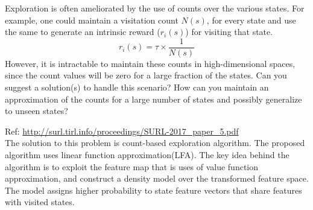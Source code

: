 \documentclass[solution,addpoints,12pt]{exam}
\begin{document}
\begin{questions}
\question[4] Exploration is often ameliorated by the use of counts over the various states. For example, one could maintain a visitation count $N(s)$, for every state and use the same to generate an intrinsic reward ($r_i(s)$) for visiting that state.
\[ r_i(s) = \tau \times \frac{1}{N(s)} \]
However, it is intractable to maintain these counts in high-dimensional spaces, since the count values will be zero for a large fraction of the states. Can you suggest a solution(s) to handle this scenario? How can you maintain an approximation of the counts for a large number of states and possibly generalize to unseen states?

\begin{solution}
Ref: \url{http://surl.tirl.info/proceedings/SURL-2017_paper_5.pdf} \\
The solution to this problem is count-based exploration algorithm. The proposed algorithm uses linear function approximation(LFA). 
The key idea behind the algorithm is to exploit the feature map that is uses of value function approximation, and construct a density model over the transformed feature space. The model assigns higher probability to state feature vectors that share features with visited states.


\end{solution}
\end{questions}
\end{document}
